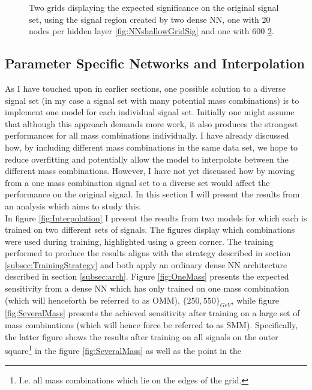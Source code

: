 \begin{figure}
{\begin{subfigure}{.6\textwidth}
        \vspace{-1.cm}
        \caption{}
        \label{fig:NNGridSig}
    \end{subfigure}
    }
    \caption{Two grids displaying the expected significance on the original signal set, using the signal region 
    created by two dense \acs{NN}, one with 20 nodes per hidden layer \ref{fig:NNshallowGridSig} and one with 600 \ref{fig:NNGridSig}.}
\end{figure}
\subsection{Parameter Specific Networks and Interpolation}
As I have touched upon in earlier sections, one possible solution to a diverse signal set (in my case a signal set with many 
potential mass combinations) is to implement one model for each individual signal set. Initially one might assume that although 
this approach demands more work, it also produces the strongest performances for all mass combinations individually. I have already 
discussed how, by including different mass combinations in the same data set, we hope to reduce overfitting and potentially allow 
the model to interpolate between the different mass combinations. However, I have not yet discussed how by moving from a one 
mass combination signal set to a diverse set would affect the performance on the original signal. In this section I will present the 
results from an analysis which aims to study this.
\\
In figure \ref{fig:Interpolation} I present the results from two models for which each is trained on two different sets of signals.
The figures display which combinations were used during training, highlighted using a green corner. 
The training performed to produce the results aligns with the strategy described in section \ref{subsec:TrainingStrategy} and both apply
an ordinary dense \ac{NN} architecture described in section \ref{subsec:arch}. Figure \ref{fig:OneMass} presents the expected sensitivity 
from a dense \ac{NN} which has only trained on one mass combination (which will henceforth be referred to as \ac{OMM}), $\{250,550\}_{GeV}$, 
while figure \ref{fig:SeveralMass} presents the achieved sensitivity after training on a large set of mass combinations 
(which will hence force be referred to as \ac{SMM}). Specifically, the latter figure shows the results after training on all signals on the outer 
square\footnote{I.e. all mass combinations which lie on the edges of the grid.} in the figure \ref{fig:SeveralMass} as well as the point in the 
